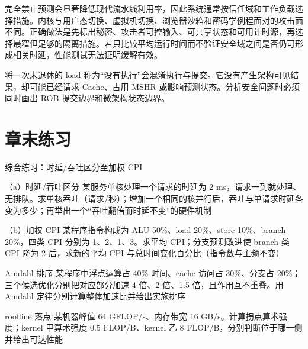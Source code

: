 完全禁止预测会显著降低现代流水线利用率，因此系统通常按信任域和工作负载选择措施。内核与用户态切换、虚拟机切换、浏览器沙箱和密码学例程面对的攻击面不同。正确做法是先标出秘密、攻击者可控输入、可共享状态和可用计时源，再选择最窄但足够的隔离措施。若只比较平均运行时间而不验证安全域之间是否仍可形成相关时延，性能测试无法证明缓解有效。

\begin{warningbox}
将一次未退休的 load 称为“没有执行”会混淆执行与提交。它没有产生架构可见结果，却可能已经请求 Cache、占用 MSHR 或影响预测状态。分析安全问题时必须同时画出 ROB 提交边界和微架构状态边界。
\end{warningbox}

\section*{章末练习}

\begin{chapterexercise}{综合练习：时延/吞吐区分至加权 CPI}
\begin{exercisesubproblem}{（a）时延/吞吐区分}
某服务单核处理一个请求的时延为 2 ms，请求一到就处理、无排队。求单核吞吐（请求/秒）；增加一个相同的核并行后，吞吐与单请求时延各变为多少；再举出一个“吞吐翻倍而时延不变”的硬件机制
\end{exercisesubproblem}
\begin{exercisesubproblem}{（b）加权 CPI}
某程序指令构成为 ALU 50\%、load 20\%、store 10\%、branch 20\%，四类 CPI 分别为 1、2、1、3。求平均 CPI；分支预测改进使 branch 类 CPI 降为 2 后，求新的平均 CPI 与总时间变化百分比（指令数与主频不变）
\end{exercisesubproblem}
\end{chapterexercise}

\begin{chapterexercise}{Amdahl 排序}
某程序中浮点运算占 40\% 时间、cache 访问占 30\%、分支占 20\%；三个候选优化分别把对应部分加速 4 倍、2 倍、1.5 倍，且作用互不重叠。用 Amdahl 定律分别计算整体加速比并给出实施排序
\end{chapterexercise}

\begin{chapterexercise}{roofline 落点}
某机器峰值 64 GFLOP/s、内存带宽 16 GB/s。计算拐点算术强度；kernel 甲算术强度 0.5 FLOP/B、kernel 乙 8 FLOP/B，分别判断位于哪一侧并给出可达性能
\end{chapterexercise}

